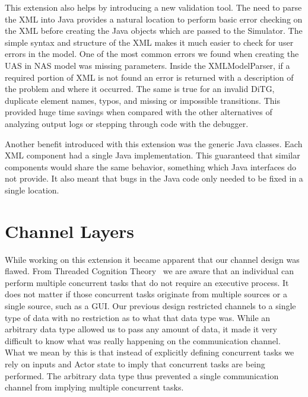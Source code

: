 This extension also helps by introducing a new validation tool.  The need to parse the XML into Java provides a natural location to perform basic error checking on the XML before creating the Java objects which are passed to the Simulator. The simple syntax and structure of the XML makes it much easier to check for user errors in the model.  One of the most common errors we found when creating the UAS in NAS model was missing parameters.  Inside the XMLModelParser, if a required portion of XML is not found an error is returned with a description of the problem and where it occurred.  The same is true for an invalid DiTG, duplicate element names, typos, and missing or impossible transitions.  This provided huge time savings when compared with the other alternatives of analyzing output logs or stepping through code with the debugger.

Another benefit introduced with this extension was the generic Java classes.  Each XML component had a single Java implementation.  This guaranteed that similar components would share the same behavior, something which Java interfaces do not provide.  It also meant that bugs in the Java code only needed to be fixed in a single location.

\section{Channel Layers}

While working on this extension it became apparent that our channel design was flawed.  From Threaded Cognition Theory~\cite{salvucci2008threaded} we are aware that an individual can perform multiple concurrent tasks that do not require an executive process.  It does not matter if those concurrent tasks originate from multiple sources or a single source, such as a GUI.  Our previous design restricted channels to a single type of data with no restriction as to what that data type was.  While an arbitrary data type allowed us to pass any amount of data, it made it very difficult to know what was really happening on the communication channel.  What we mean by this is that instead of explicitly defining concurrent tasks we rely on inputs and Actor state to imply that concurrent tasks are being performed.  The arbitrary data type thus prevented a single communication channel from implying multiple concurrent tasks.

